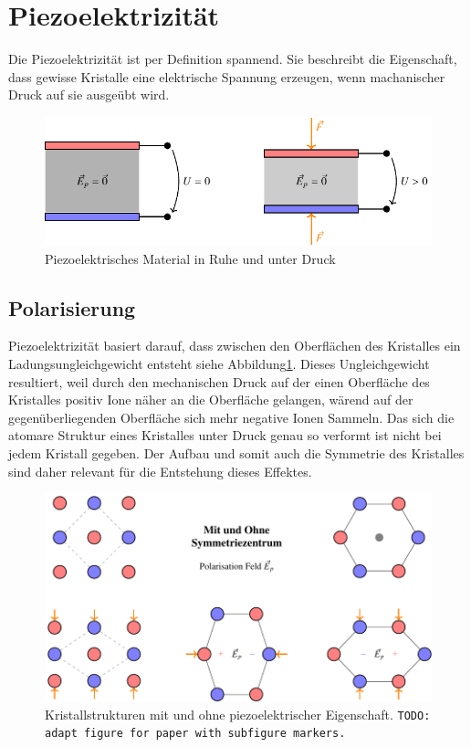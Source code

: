 \section{Piezoelektrizität}
Die Piezoelektrizität ist per Definition spannend.
Sie beschreibt die Eigenschaft, dass gewisse Kristalle eine elektrische Spannung erzeugen, wenn machanischer Druck auf sie ausgeübt wird.

\begin{figure}
    \centering
    \includegraphics[]{papers/punktgruppen/figures/piezo} %
    \caption{Piezoelektrisches Material in Ruhe und unter Druck}
    \label{fig:punktgruppen:basicPiezo}
\end{figure}

\subsection{Polarisierung}
Piezoelektrizität basiert darauf, dass zwischen den Oberflächen des Kristalles ein Ladungsungleichgewicht entsteht siehe Abbildung\ref{fig:punktgruppen:basicPiezo}.
Dieses Ungleichgewicht resultiert, 
weil durch den mechanischen Druck auf der einen Oberfläche des Kristalles positiv Ione näher an die Oberfläche gelangen,
wärend auf der gegenüberliegenden Oberfläche sich mehr negative Ionen Sammeln.
Das sich die atomare Struktur eines Kristalles unter Druck genau so verformt ist nicht bei jedem Kristall gegeben.
Der Aufbau und somit auch die Symmetrie des Kristalles sind daher relevant für die Entstehung dieses Effektes.

\begin{figure}
    \centering
    \includegraphics[]{papers/punktgruppen/figures/piezo-atoms} 
    \caption{
        Kristallstrukturen mit und ohne piezoelektrischer Eigenschaft.
        \texttt{TODO: adapt figure for paper with subfigure markers.}
    }
    \label{fig:punktgruppen:atomPiezo}
\end{figure}


